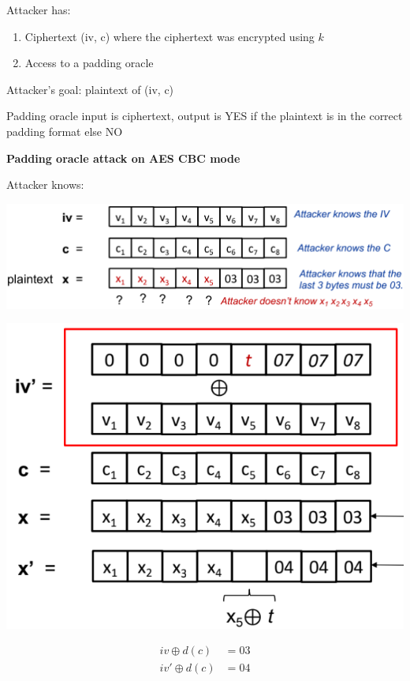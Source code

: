 \documentclass[landscape,a4paper]{extarticle}
\newenvironment{Figure}
  {\par\noindent\minipage{\linewidth}}
  {\endminipage\par\medskip}
\begin{document}
\begin{multicols*}{5}
    Attacker has:
    \begin{enumerate}
        \item Ciphertext (iv, c) where the ciphertext was encrypted using $k$
        \item Access to a padding oracle
    \end{enumerate}
    Attacker's goal: plaintext of (iv, c)

    Padding oracle input is ciphertext, output is YES if the plaintext is in the correct
    padding format else NO

    \textbf{Padding oracle attack on AES CBC mode}

    Attacker knows:

    \begin{Figure}
        \centering
        \includegraphics[width=\linewidth]{padding_oracle_attacker_knowledge.png}
    \end{Figure}

    \begin{Figure}
        \centering
        \includegraphics[width=\linewidth]{padding_oracle_attack.png}
    \end{Figure}

    \begin{align*}
        iv \oplus d(c) &= 03\\
        iv' \oplus d(c) &= 04
    \end{align*}


\end{multicols*}
\end{document}
